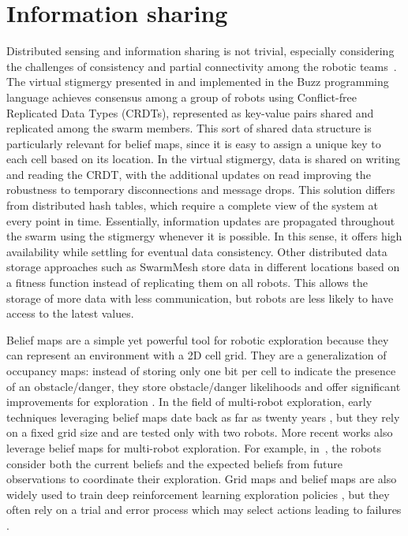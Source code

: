 \section{Information sharing}
Distributed sensing and information sharing is not trivial, especially considering
the challenges of consistency and partial connectivity among the
robotic teams~\cite{amigoni2017multirobot,otte2018emergent}. The virtual stigmergy
presented in \cite{pinciroliTuple2016} and implemented in the Buzz
programming language \cite{pinciroliBuzz2016} achieves consensus among
a group of robots using Conflict-free Replicated Data Types (CRDTs),
represented as key-value pairs shared and replicated among the swarm members. This sort of shared data structure is
particularly relevant for belief maps, since it is easy to assign a
unique key to each cell based on its location.  In the virtual
stigmergy, data is shared on writing and reading the CRDT, with the
additional updates on read improving the robustness to temporary
disconnections and message drops. This solution differs from
distributed hash tables, which require a complete view of the system
at every point in time. Essentially, information updates are propagated throughout the swarm using the stigmergy whenever it is possible. In this sense, it offers high availability while settling for eventual data consistency. Other distributed data storage approaches such
as SwarmMesh \cite{majcherczykSwarmmesh2020} store data in different
locations based on a fitness function instead of replicating them on
all robots. This allows the storage of more data with less
communication, but robots are less likely to have access to the latest
values.

Belief maps are a simple yet powerful tool for robotic exploration
because they can represent an environment with a 2D cell grid. They
are a generalization of occupancy maps: instead of storing only one
bit per cell to indicate the presence of an obstacle/danger, they
store obstacle/danger likelihoods and offer significant improvements
for exploration \cite{stachnissMappingExplorationMobile2003}. In the
field of multi-robot exploration, early techniques leveraging belief
maps date back as far as twenty years
\cite{kobayashiSharingExploringInformation2002,kobayashiDeterminationExplorationTarget2003},
but they rely on a fixed grid size and are tested only with two
robots. More recent works also leverage belief maps for multi-robot
exploration. For example,
in~\cite{indelmanCooperativeMultirobotBelief2018}, the robots consider
both the current beliefs and the expected beliefs from future
observations to coordinate their exploration. Grid maps and belief
maps are also widely used to train deep reinforcement learning
exploration policies
\cite{hanGridWiseControlMultiAgent,panovGridPathPlanning2018}, but they often rely on a trial and error process which may select actions leading to failures \cite{garciaSafeExplorationState2012,andersenSafeReinforcementlearningIndustrial2020}.

